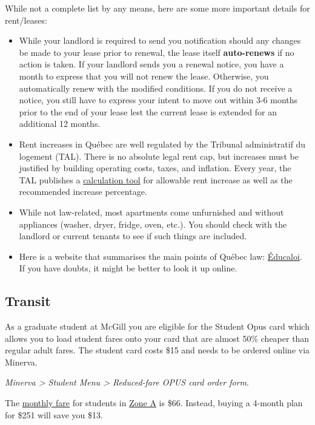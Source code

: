 \noindent While not a complete list by any means, here are some more important details for rent/leases: 
\begin{plaincorollary}
    \begin{itemize}[leftmargin=10pt]
        \item While your landlord is required to send you notification should any changes be made to your lease prior to renewal, the lease itself \textbf{auto-renews} if no action is taken. If your landlord sends you a renewal notice, you have a month to express that you will not renew the lease. Otherwise, you automatically renew with the modified conditions. If you do not receive a notice, you still have to express your intent to move out within 3-6 months prior to the end of your lease lest the current lease is extended for an additional 12 months. 
        \item  Rent increases in Québec are well regulated by the Tribunal administratif du logement (TAL). There is no absolute legal rent cap, but increases must be justified by building operating costs, taxes, and inflation. Every year, the TAL publishes a \href{https://www.tal.gouv.qc.ca/en/calculation-for-rent-increase}{calculation tool} for allowable rent increase as well as the recommended increase percentage. 
        \item While not law-related, most apartments come unfurnished and without appliances (washer, dryer, fridge, oven, etc.). You should check with the landlord or current tenants to see if such things are included. 
        \item Here is a website that summarises the main points of Québec law: \href{https://educaloi.qc.ca/en/web-guide/rental-housing/}{Éducaloi}. If you have doubts, it might be better to look it up online.
    \end{itemize} 
\end{plaincorollary}

\subsection{Transit} 
As a graduate student at McGill you are eligible for the Student Opus card which allows you to load student fares onto your card that are almost 50\% cheaper than regular adult fares. The student card costs \$15 and needs to be ordered online via Minerva.

\textit{Minerva > Student Menu > Reduced-fare OPUS card order form}.

The \href{https://www.stm.info/sites/default/files/pdf/en/tarifs.pdf}{monthly fare} for students in \href{https://www.artm.quebec/zones-tarifaires/}{Zone A} is \$66. Instead, buying a 4-month plan for \$251 will save you \$13. 

